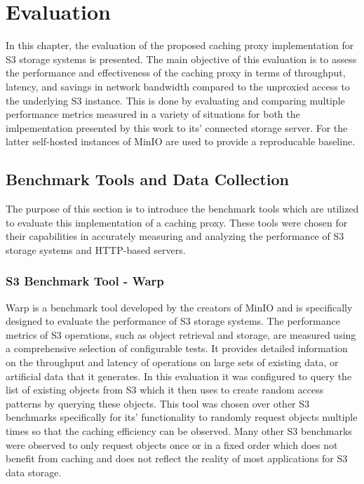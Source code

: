 \chapter{Evaluation}

In this chapter, the evaluation of the proposed caching proxy implementation for S3 storage systems is presented. The main objective of this evaluation is to assess the performance and effectiveness of the caching proxy in terms of throughput, latency, and savings in network bandwidth compared to the unproxied access to the underlying S3 instance.
This is done by evaluating and comparing multiple performance metrics measured in a variety of situations for both the imlpementation presented by this work to its' connected storage server. For the latter self-hosted instances of MinIO are used to provide a reproducable baseline.

\section{Benchmark Tools and Data Collection}

The purpose of this section is to introduce the benchmark tools which are utilized to evaluate this implementation of a caching proxy. These tools were chosen for their capabilities in accurately measuring and analyzing the performance of S3 storage systems and HTTP-based servers.

\subsection{S3 Benchmark Tool - Warp}
\label{warp}
Warp is a benchmark tool developed by the creators of MinIO and is specifically designed to evaluate the performance of S3 storage systems. The performance metrics of S3 operations, such as object retrieval and storage, are measured using a comprehensive selection of configurable tests. It provides detailed information on the throughput and latency of operations on large sets of existing data, or artificial data that it generates.
In this evaluation it was configured to query the list of existing objects from S3 which it then uses to create random access patterns by querying these objects. This tool was chosen over other S3 benchmarks specifically for its' functionality to randomly request objects multiple times so that the caching efficiency can be  observed. Many other S3 benchmarks were observed to only request objects once or in a fixed order which does not benefit from caching and does not reflect the reality of most applications for S3 data storage.

